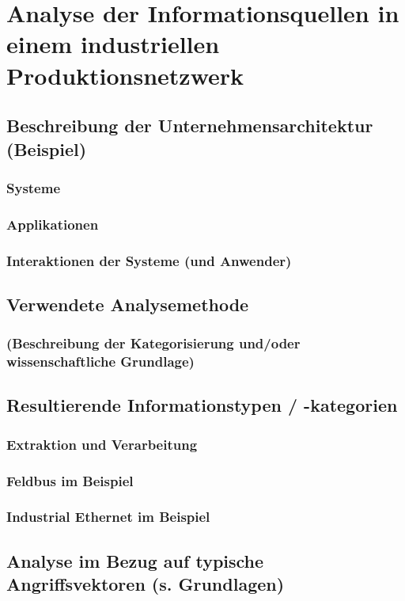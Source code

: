 \chapter{Analyse der Informationsquellen in einem industriellen Produktionsnetzwerk}
\label{cha:Analyse der Informationsquellen in einem industriellen Produktionsnetzwerk}
\section{Beschreibung der Unternehmensarchitektur (Beispiel)}
\subsection{Systeme}
\subsection{Applikationen}
\subsection{Interaktionen der Systeme (und Anwender)}
\section{Verwendete Analysemethode}
\subsection{(Beschreibung der Kategorisierung und/oder wissenschaftliche Grundlage)}
\section{Resultierende Informationstypen / -kategorien}
\subsection{Extraktion und Verarbeitung}
\subsection{Feldbus im Beispiel}
\subsection{Industrial Ethernet im Beispiel}
\section{Analyse im Bezug auf typische Angriffsvektoren (s. Grundlagen)}